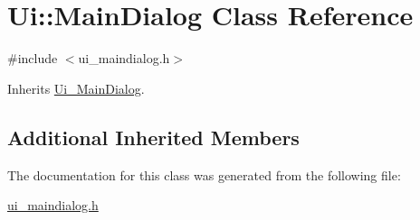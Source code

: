 \hypertarget{class_ui_1_1_main_dialog}{\section{Ui\-:\-:Main\-Dialog Class Reference}
\label{class_ui_1_1_main_dialog}
}


{\ttfamily \#include $<$ui\-\_\-maindialog.\-h$>$}



Inherits \hyperlink{class_ui___main_dialog}{Ui\-\_\-\-Main\-Dialog}.

\subsection*{Additional Inherited Members}


The documentation for this class was generated from the following file\-:\begin{DoxyCompactItemize}
\item 
\hyperlink{ui__maindialog_8h}{ui\-\_\-maindialog.\-h}\end{DoxyCompactItemize}
